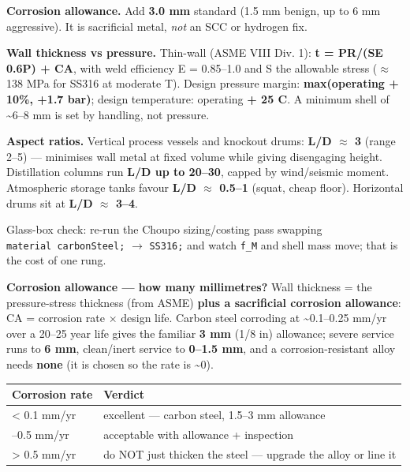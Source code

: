 \documentclass[11pt,a4paper]{article}
\begin{document}
\textbf{Corrosion allowance.} Add \textbf{3.0 mm} standard (1.5 mm
benign, up to 6 mm aggressive). It is sacrificial metal, \emph{not} an
SCC or hydrogen fix.

\textbf{Wall thickness vs pressure.} Thin-wall (ASME VIII Div. 1):
\textbf{t = P\textperiodcentered{}R/(S\textperiodcentered{}E \textminus{} 0.6\textperiodcentered{}P) + CA}, with weld efficiency E = 0.85--1.0
and S the allowable stress (\(\approx\) 138 MPa for SS316 at moderate T). Design
pressure margin: \textbf{max(operating + 10\%, +1.7 bar)}; design
temperature: operating \textbf{+ 25 \textdegree{}C}. A minimum shell of
\textasciitilde6--8 mm is set by handling, not pressure.

\textbf{Aspect ratios.} Vertical process vessels and knockout drums:
\textbf{L/D \(\approx\) 3} (range 2--5) --- minimises wall metal at fixed volume
while giving disengaging height. Distillation columns run \textbf{L/D up
to 20--30}, capped by wind/seismic moment. Atmospheric storage tanks
favour \textbf{L/D \(\approx\) 0.5--1} (squat, cheap floor). Horizontal drums sit
at \textbf{L/D \(\approx\) 3--4}.

Glass-box check: re-run the Choupo sizing/costing pass swapping
\texttt{material\ carbonSteel;} \(\rightarrow\) \texttt{SS316;} and watch
\texttt{f\_M} and shell mass move; that is the cost of one rung.

\textbf{Corrosion allowance --- how many millimetres?} Wall thickness =
the pressure-stress thickness (from ASME) \textbf{plus a sacrificial
corrosion allowance}: CA = corrosion rate \(\times\) design life. Carbon steel
corroding at \textasciitilde0.1--0.25 mm/yr over a 20--25 year life
gives the familiar \textbf{3 mm} (1/8 in) allowance; severe service runs
to \textbf{6 mm}, clean/inert service to \textbf{0--1.5 mm}, and a
corrosion-resistant alloy needs \textbf{none} (it is chosen so the rate
is \textasciitilde0).

\begin{longtable}[]{@{}>{\raggedright\arraybackslash}p{\dimexpr(\linewidth-4\tabcolsep)/2\relax}>{\raggedright\arraybackslash}p{\dimexpr(\linewidth-4\tabcolsep)/2\relax}@{}}
\toprule\noalign{}
Corrosion rate & Verdict \\
\midrule\noalign{}
\endhead
\bottomrule\noalign{}
\endlastfoot
\textless{} 0.1 mm/yr & excellent --- carbon steel, 1.5--3 mm
allowance \\
0.1--0.5 mm/yr & acceptable with allowance + inspection \\
\textgreater{} 0.5 mm/yr & do NOT just thicken the steel --- upgrade the
alloy or line it \\
\end{longtable}
\end{document}
